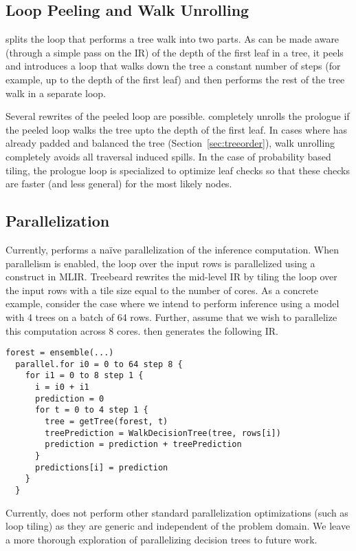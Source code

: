 \subsection{Loop Peeling and Walk Unrolling}
\Treebeard{} splits the loop that performs a tree walk into two parts. As can be made aware (through a simple pass on the IR) of the depth of the first leaf in a tree, it peels and introduces a  loop that walks down the tree a constant number of steps (for example, up to the depth of the first leaf) and then performs the rest of the tree walk in a separate loop.

Several rewrites of the peeled loop are possible. \Treebeard{} completely unrolls the prologue if the peeled loop 
walks the tree upto the depth of the first leaf. In cases where \Treebeard{} has already padded and balanced the 
tree (Section~\ref{sec:treeorder}), walk unrolling completely avoids all traversal induced spills. In the case of 
probability based tiling, the prologue loop is specialized to optimize leaf checks so that these checks 
are faster (and less general) for the most likely nodes.


\subsection{Parallelization}
Currently, \Treebeard{} performs a na\"ive parallelization of the inference computation. When parallelism is enabled, the 
loop over the input rows is parallelized using a  construct in MLIR. Treebeard rewrites 
the mid-level IR by tiling the loop over the input rows with a tile size equal to the number of cores. 
As a concrete example, consider the case where we intend to perform inference using a model with 4 trees 
on a batch of 64 rows. Further, assume that we wish to parallelize this computation across 8 cores. 
\Treebeard{} then generates the following IR.
\begin{lstlisting}[style=c++]
  forest = ensemble(...)
  parallel.for i0 = 0 to 64 step 8 {
    for i1 = 0 to 8 step 1 {
      i = i0 + i1
      prediction = 0
      for t = 0 to 4 step 1 {
        tree = getTree(forest, t) 
        treePrediction = WalkDecisionTree(tree, rows[i])
        prediction = prediction + treePrediction
      }
      predictions[i] = prediction
    }
  }
\end{lstlisting}
Currently, \Treebeard{} does not perform other standard parallelization optimizations  (such as loop tiling) as they
are generic and independent of the problem domain. We leave a more thorough exploration of parallelizing decision trees
to future work.